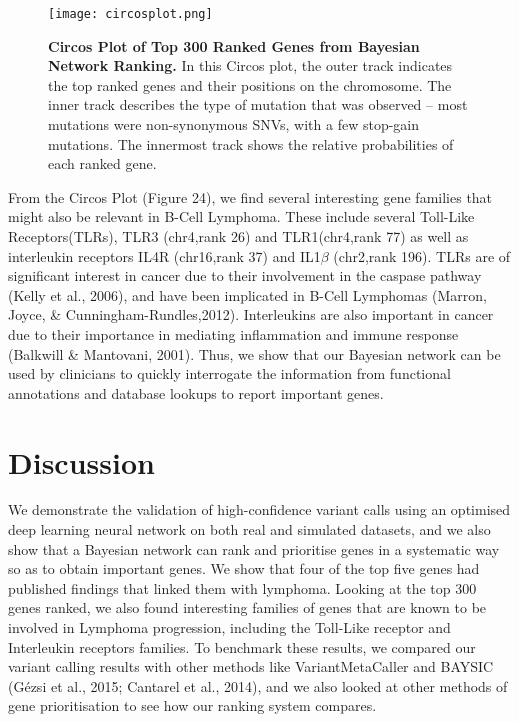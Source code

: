 \documentclass{article}
\begin{document}
\begin{figure}[H]
\texttt{[image: circosplot.png]}
\caption{\textbf{Circos Plot of Top 300 Ranked Genes from Bayesian Network Ranking.} In this Circos plot, the outer track indicates the top ranked genes and their positions on the chromosome. The inner track describes the type of mutation that was observed -- most mutations were non-synonymous SNVs, with a few stop-gain mutations. The innermost track shows the relative probabilities of each ranked gene.}
\centering
\end{figure}

From the Circos Plot (Figure 24), we find several interesting gene families that might also be relevant in B-Cell Lymphoma. These include several Toll-Like Receptors(TLRs), TLR3 (chr4,rank 26) and TLR1(chr4,rank 77) as well as interleukin receptors IL4R (chr16,rank 37) and IL1$\beta$ (chr2,rank 196). TLRs are of significant interest in cancer due to their involvement in the caspase pathway (Kelly et al., 2006), and have been implicated in B-Cell Lymphomas (Marron, Joyce, \& Cunningham-Rundles,2012). Interleukins are also important in cancer due to their importance in mediating inflammation and immune response (Balkwill \& Mantovani, 2001). Thus, we show that our Bayesian network can be used by clinicians to quickly interrogate the information from functional annotations and database lookups to report important genes. 

\newpage
\section{Discussion}
We demonstrate the validation of high-confidence variant calls using an optimised deep learning neural network on both real and simulated datasets, and we also show that a Bayesian network can rank and prioritise genes in a systematic way so as to obtain important genes. We show that four of the top five genes had published findings that linked them with lymphoma. Looking at the top 300 genes ranked, we also found interesting families of genes that are known to be involved in Lymphoma progression, including the Toll-Like receptor and Interleukin receptors families. To benchmark these results, we compared our variant calling results with other methods like VariantMetaCaller and BAYSIC (Gézsi et al., 2015; Cantarel et al., 2014), and we also looked at other methods of gene prioritisation to see how our ranking system compares.
\end{document}
